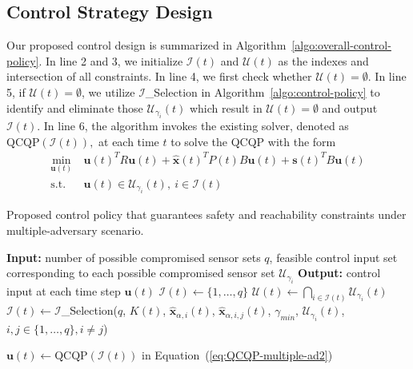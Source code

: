 \documentclass[journal]{IEEEtran}
\begin{document}
\subsection{Control Strategy Design}
Our proposed control design is summarized in Algorithm~\ref{algo:overall-control-policy}. In line 2 and 3, we initialize $\mathcal{I}(t)$ and $\mathcal{U}(t)$ as the indexes and intersection of all constraints. In line 4, we first check whether $\mathcal{U}(t) = \emptyset$. In line 5, if $\mathcal{U}(t) = \emptyset$, we utilize $\mathcal{I}$\_Selection in Algorithm~\ref{algo:control-policy} to identify and eliminate those $\mathcal{U}_{\gamma_i}(t)$ which result in $\mathcal{U}(t) = \emptyset$ and output $\mathcal{I}(t)$. %
In line 6, the algorithm invokes the existing solver, denoted as $\text{QCQP}(\mathcal{I}(t)),$ at each time $t$ to solve the QCQP with the form 
\begin{equation}
\label{eq:QCQP-multiple-ad2}
\begin{split}
\min_{\mathbf{u}(t)} & \ \mathbf{u}(t)^{T}R\mathbf{u}(t) + \hat{\mathbf{x}}(t)^{T}P(t)B\mathbf{u}(t) + \mathbf{s}(t)^{T}B\mathbf{u}(t) \\
\mbox{s.t.} & \ \mathbf{u}(t) \in \mathcal{U}_{\gamma_i}(t), \ i \in \mathcal{I}(t)
\end{split}
\end{equation} 

 
\begin{algorithm}[h]
	\caption{Proposed control policy that guarantees safety and reachability constraints under multiple-adversary scenario.}
	\label{algo:overall-control-policy}
	\begin{algorithmic}[1]
	    \State \textbf{Input: }number of possible compromised sensor sets $q$, feasible control input set corresponding to each possible compromised sensor set $\mathcal{U}_{\gamma_i}$
	    \State \textbf{Output: }control input at each time step $\mathbf{u}(t)$
	    \State $\mathcal{I}(t) \leftarrow \{1,\ldots,q\}$
	    \State $\mathcal{U}(t) \leftarrow \bigcap_{i \in \mathcal{I}(t)} \mathcal{U}_{\gamma_i}(t)$
	        \State $\mathcal{I}(t) \leftarrow \mathcal{I}$\_Selection($q$, $K(t)$, $\hat{\mathbf{x}}_{\alpha,i}(t)$, $\hat{\mathbf{x}}_{\alpha,i,j}(t)$, $\gamma_{min}$, $\mathcal{U}_{\gamma_i}(t)$, $i,j \in \{1,\ldots,q\}, i \neq j$)
	    \EndIf
	    
	    \State $\mathbf{u}(t) \leftarrow \text{QCQP}(\mathcal{I}(t))$ in Equation~(\ref{eq:QCQP-multiple-ad2})
	    \State {}
	\EndProcedure
	\end{algorithmic}
\end{algorithm}
\end{document}
